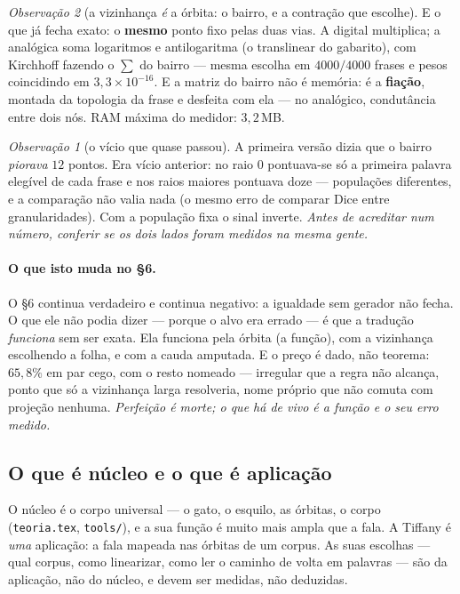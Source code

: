 \documentclass[11pt]{article}
\theoremstyle{plain}
\theoremstyle{remark}
\newtheorem{obs}{Observação}
\begin{document}
\begin{obs}[a vizinhança \emph{é} a órbita: o bairro, e a contração que escolhe]
E o que já fecha exato: o \textbf{mesmo} ponto fixo pelas duas vias. A digital multiplica; a analógica
soma logaritmos e antilogaritma (o translinear do gabarito), com Kirchhoff fazendo o $\sum$ do bairro
--- mesma escolha em $4000/4000$ frases e pesos coincidindo em $3{,}3\times10^{-16}$. E a matriz do
bairro não é memória: é a \textbf{fiação}, montada da topologia da frase e desfeita com ela --- no
analógico, condutância entre dois nós. RAM máxima do medidor: $3{,}2\,$MB.

\begin{obs}[o vício que quase passou]
A primeira versão dizia que o bairro \emph{piorava} $12$ pontos. Era vício anterior: no raio $0$ pontuava-se
só a primeira palavra elegível de cada frase e nos raios maiores pontuava doze --- populações
diferentes, e a comparação não valia nada (o mesmo erro de comparar Dice entre granularidades). Com a
população fixa o sinal inverte. \emph{Antes de acreditar num número, conferir se os dois lados foram
medidos na mesma gente.}
\end{obs}
\end{obs}

\paragraph{O que isto muda no §6.} O §6 continua verdadeiro e continua negativo: a igualdade sem gerador
não fecha. O que ele não podia dizer --- porque o alvo era errado --- é que a tradução \emph{funciona}
sem ser exata. Ela funciona pela órbita (a função), com a vizinhança escolhendo a folha, e com a cauda
amputada. E o preço é dado, não teorema: $65{,}8\%$ em par cego, com o resto nomeado --- irregular que a
regra não alcança, ponto que só a vizinhança larga resolveria, nome próprio que não comuta com projeção
nenhuma. \emph{Perfeição é morte; o que há de vivo é a função e o seu erro medido.}

\subsection{O que é núcleo e o que é aplicação}

O núcleo é o corpo universal --- o gato, o esquilo, as órbitas, o corpo (\texttt{teoria.tex},
\texttt{tools/}), e a sua função é muito mais ampla que a fala. A Tiffany é \emph{uma} aplicação: a
fala mapeada nas órbitas de um corpus. As suas escolhas --- qual corpus, como linearizar, como ler o
caminho de volta em palavras --- são da aplicação, não do núcleo, e devem ser medidas, não deduzidas.
\end{document}
